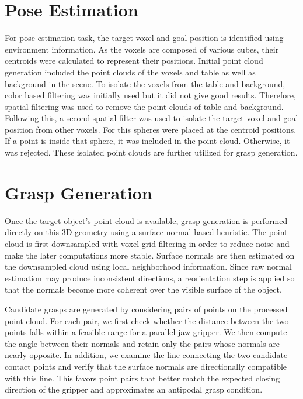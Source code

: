 \documentclass[conference]{IEEEtran}
\begin{document}
\section{Pose Estimation}
For pose estimation task, the target voxel and goal position is identified using environment information. As the voxels are composed of various cubes, their centroids were calculated to represent their positions. Initial point cloud generation included the point clouds of the voxels and table as well as background in the scene. To isolate the voxels from the table and background, color based filtering was initially used but it did not give good results. Therefore, spatial filtering was used to remove the point clouds of table and background. Following this, a second spatial filter was used to isolate the target voxel and goal position from other voxels. For this spheres were placed at the centroid positions. If a point is inside that sphere, it was included in the point cloud. Otherwise, it was rejected. These isolated point clouds are further utilized for grasp generation.

\section{Grasp Generation}

Once the target object's point cloud is available, grasp generation is performed directly on this 3D geometry using a surface-normal-based heuristic. The point cloud is first downsampled with voxel grid filtering in order to reduce noise and make the later computations more stable. Surface normals are then estimated on the downsampled cloud using local neighborhood information. Since raw normal estimation may produce inconsistent directions, a reorientation step is applied so that the normals become more coherent over the visible surface of the object.

Candidate grasps are generated by considering pairs of points on the processed point cloud. For each pair, we first check whether the distance between the two points falls within a feasible range for a parallel-jaw gripper. We then compute the angle between their normals and retain only the pairs whose normals are nearly opposite. In addition, we examine the line connecting the two candidate contact points and verify that the surface normals are directionally compatible with this line. This favors point pairs that better match the expected closing direction of the gripper and approximates an antipodal grasp condition.
\end{document}
